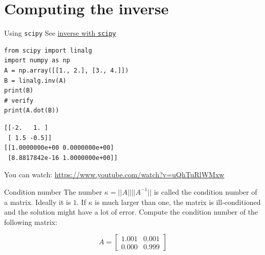 \documentclass[xcolor=svgnames,t,10pt,allowframebreaks]{beamer}
\begin{document}
\begin{frame}[standout,label=]{}
\end{frame}
\section{Computing the inverse}
\label{sec:org7598823}
\begin{frame}[fragile,label={sec:org2d22ade}]{Using \texttt{scipy}}
 See \href{https://docs.scipy.org/doc/scipy/reference/generated/scipy.linalg.inv.html\#scipy.linalg.inv}{inverse with \texttt{scipy}}
\begin{verbatim}
from scipy import linalg
import numpy as np
A = np.array([[1., 2.], [3., 4.]])
B = linalg.inv(A)
print(B)
# verify
print(A.dot(B))
\end{verbatim}

\begin{verbatim}
[[-2.   1. ]
 [ 1.5 -0.5]]
[[1.0000000e+00 0.0000000e+00]
 [8.8817842e-16 1.0000000e+00]]
\end{verbatim}


You can watch: \url{https://www.youtube.com/watch?v=uQhTuRlWMxw}
\end{frame}
\begin{frame}[label={sec:org34c3fd6}]{Condition number}
\vfill
The number
\(\kappa = ||A|| ||A^{-1}||\)
is called the condition number of a matrix. Ideally it is \(1\). If \(\kappa\) is much
larger than one, the matrix is ill-conditioned and the solution
might have a lot of error.
\vfill
Compute the condition number of the following matrix:

\begin{equation}
A = 
\begin{bmatrix}
1.001 & 0.001\\
0.000 & 0.999
\end{bmatrix}
\end{equation}
\vfill
\end{frame}
\begin{frame}[standout,label=]{}
\end{frame}
\end{document}
